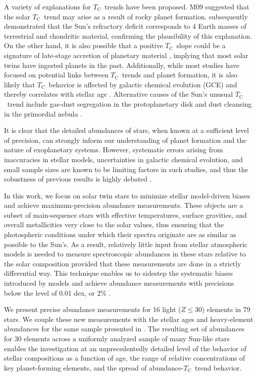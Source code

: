 \documentclass[twocolumn, trackchanges]{aastex62}
\newcommand{\tc}{$T_\mathrm{C}$}
\begin{document}
A variety of explanations for \tc\ trends have been proposed. M09 suggested that the solar \tc\ trend may arise as a result of rocky planet formation. \citet{chambers10} subsequently demonstrated that the Sun's refractory deficit corresponds to 4 Earth masses of terrestrial and chondritic material, confirming the plausibility of this explanation. On the other hand, it is also possible that a positive \tc\ slope could be a signature of late-stage accretion of planetary material \citep[e.g.][]{ramirez11, spina15, oh17}, implying that most solar twins have ingested planets in the past. Additionally, while most studies have focused on potential links between \tc\ trends and planet formation, it is also likely that \tc\ behavior is affected by galactic chemical evolution (GCE) and thereby correlates with stellar age \citep{adibekyan14, nissen15, spina16b}. Alternative causes of the Sun's unusual \tc\ trend include gas-dust segregation in the protoplanetary disk and dust cleansing in the primordial nebula \citep{onehag14, gaidos15}.

It is clear that the detailed abundances of stars, when known at a sufficient level of precision, can strongly inform our understanding of planet formation and the nature of exoplanetary systems. 
However, systematic errors arising from inaccuracies in stellar models, uncertainties in galactic chemical evolution, and small sample sizes are known to be limiting factors in such studies, and thus the robustness of previous results is highly debated \citep{asplund09, fortney12, hinkel16, adibekyan14, nissen15}.

In this work, we focus on solar twin stars to minimize stellar model-driven biases and achieve maximum-precision abundance measurements. These objects are a subset of main-sequence stars with effective temperatures, surface gravities, and overall metallicities very close to the solar values, thus ensuring that the photospheric conditions under which their spectra originate are as similar as possible to the Sun's. As a result, relatively little input from stellar atmospheric models is needed to measure spectroscopic abundances in these stars relative to the solar composition provided that these measurements are done in a strictly differential way. This technique enables us to sidestep the systematic biases introduced by models and achieve abundance measurements with precisions below the level of 0.01 dex, or 2\% \citep{bedell14}.

We present precise abundance measurements for 16 light ($Z \leq 30$) elements in 79 stars. We couple these new measurements with the stellar ages and heavy-element abundances for the same sample presented in \citet{spina17}. The resulting set of abundances for 30 elements across a uniformly analyzed sample of many Sun-like stars enables the investigation at an unprecedentedly detailed level of the behavior of stellar compositions as a function of age, the range of relative concentrations of key planet-forming elements, and the spread of abundance-\tc\ trend behavior.
\end{document}
